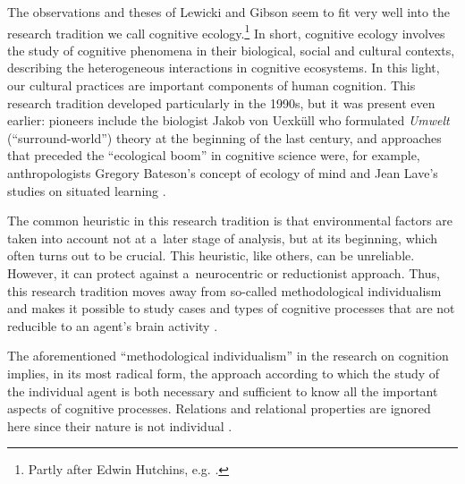 \documentclass[%
manuscript=article,
year=2024,
volume=77,
doi=10.59203/zfn.77.693,
]{zfn}
\begin{document}
The observations and theses of Lewicki and Gibson seem to fit very well into the research tradition we call cognitive ecology.\footnote{Partly after Edwin Hutchins, e.g. 
\parencite*[][]{hutchins_cognitive_2010}.%
} In short, cognitive ecology involves the study of cognitive phenomena in their biological, social and cultural contexts, describing the heterogeneous interactions in cognitive ecosystems. In this light, our cultural practices are important components of human cognition. This research tradition developed particularly in the 1990s, but it was present even earlier: pioneers include the biologist Jakob von Uexküll 
\parencites*[][]{uexkull_umwelt_1921}[newer edition, see e.g.,][]{uexkull_umwelt_2022} %
 who formulated \textit{Umwelt} (``surround-world'') theory at the beginning of the last century, and approaches that preceded the ``ecological boom'' in cognitive science were, for example, anthropologists Gregory Bateson's concept of ecology of mind 
\parencite[][]{bateson_steps_1972} %
 and Jean Lave's studies on situated learning 
\parencite[][]{lave_cognition_1988}.%




The common heuristic in this research tradition is that environmental factors are taken into account not at a~later stage of analysis, but at its beginning, which often turns out to be crucial. This heuristic, like others, can be unreliable. However, it can protect against a~neurocentric or reductionist approach. Thus, this research tradition moves away from so-called methodological individualism and makes it possible to study cases and types of cognitive processes that are not reducible to an agent's brain activity 
\parencite[see e.g.,][]{robbins_cambridge_2008}.%




The aforementioned ``methodological individualism'' in the research on cognition implies, in its most radical form, the approach according to which the study of the individual agent is both necessary and sufficient to know all the important aspects of cognitive processes. Relations and relational properties are ignored here since their nature is not individual 
\parencite[see][]{heath_methodological_2024}.%
\end{document}
